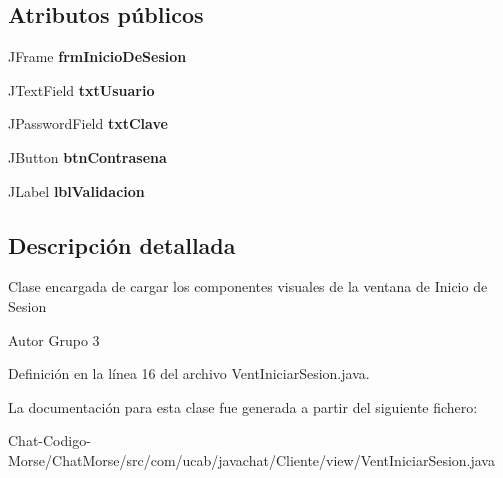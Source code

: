 \subsection*{Atributos públicos}
\begin{DoxyCompactItemize}
\item 
\hypertarget{classcom_1_1ucab_1_1javachat_1_1_cliente_1_1view_1_1_vent_iniciar_sesion_ae856c96e708fb56f72bc9cbc5d7fa2e6}{J\-Frame {\bfseries frm\-Inicio\-De\-Sesion}}\label{classcom_1_1ucab_1_1javachat_1_1_cliente_1_1view_1_1_vent_iniciar_sesion_ae856c96e708fb56f72bc9cbc5d7fa2e6}

\item 
\hypertarget{classcom_1_1ucab_1_1javachat_1_1_cliente_1_1view_1_1_vent_iniciar_sesion_a6605fb227c982704cea8d29e26209d95}{J\-Text\-Field {\bfseries txt\-Usuario}}\label{classcom_1_1ucab_1_1javachat_1_1_cliente_1_1view_1_1_vent_iniciar_sesion_a6605fb227c982704cea8d29e26209d95}

\item 
\hypertarget{classcom_1_1ucab_1_1javachat_1_1_cliente_1_1view_1_1_vent_iniciar_sesion_a0f3064f6c169e2791341e6050b2d4fcb}{J\-Password\-Field {\bfseries txt\-Clave}}\label{classcom_1_1ucab_1_1javachat_1_1_cliente_1_1view_1_1_vent_iniciar_sesion_a0f3064f6c169e2791341e6050b2d4fcb}

\item 
\hypertarget{classcom_1_1ucab_1_1javachat_1_1_cliente_1_1view_1_1_vent_iniciar_sesion_a342802505cebdc0cd4894a05ce9bbe00}{J\-Button {\bfseries btn\-Contrasena}}\label{classcom_1_1ucab_1_1javachat_1_1_cliente_1_1view_1_1_vent_iniciar_sesion_a342802505cebdc0cd4894a05ce9bbe00}

\item 
\hypertarget{classcom_1_1ucab_1_1javachat_1_1_cliente_1_1view_1_1_vent_iniciar_sesion_acbc2aba983ddff4636b19495fed687ad}{J\-Label {\bfseries lbl\-Validacion}}\label{classcom_1_1ucab_1_1javachat_1_1_cliente_1_1view_1_1_vent_iniciar_sesion_acbc2aba983ddff4636b19495fed687ad}

\end{DoxyCompactItemize}


\subsection{Descripción detallada}
Clase encargada de cargar los componentes visuales de la ventana de Inicio de Sesion \begin{DoxyAuthor}{Autor}
Grupo 3 
\end{DoxyAuthor}


Definición en la línea 16 del archivo Vent\-Iniciar\-Sesion.\-java.



La documentación para esta clase fue generada a partir del siguiente fichero\-:\begin{DoxyCompactItemize}
\item 
Chat-\/\-Codigo-\/\-Morse/\-Chat\-Morse/src/com/ucab/javachat/\-Cliente/view/Vent\-Iniciar\-Sesion.\-java\end{DoxyCompactItemize}
